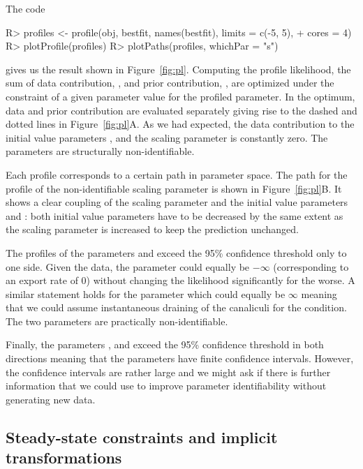 \documentclass[article]{jss}
\begin{document}
The code
\begin{CodeChunk}
\begin{CodeInput}
R> profiles <- profile(obj, bestfit, names(bestfit), limits = c(-5, 5),
+    cores = 4)
R> plotProfile(profiles)
R> plotPaths(profiles, whichPar = "s")
\end{CodeInput}
\end{CodeChunk}
%
gives us the result shown in Figure~\ref{fig:pl}.
Computing the profile likelihood, the sum of data contribution, , and prior contribution, , are optimized under the constraint of a given parameter value for the profiled parameter. In the optimum, data and prior contribution are evaluated separately giving rise to the dashed and dotted lines in Figure~\ref{fig:pl}A. As we had expected, the data contribution to the initial value parameters ,  and the scaling parameter  is constantly zero. The parameters are structurally non-identifiable.

Each profile corresponds to a certain path in parameter space. The path for the profile of the non-identifiable scaling parameter  is shown in Figure~\ref{fig:pl}B. It shows a clear coupling of the scaling parameter  and the initial value parameters  and : both initial value parameters have to be decreased by the same extent as the scaling parameter is increased to keep the prediction unchanged.

The profiles of the parameters  and  exceed the 95\% confidence threshold only to one side. Given the data, the  parameter could equally be $-\infty$ (corresponding to an export rate of 0) without changing the likelihood significantly for the worse. A similar statement holds for the  parameter which could equally be $\infty$ meaning that we could assume instantaneous draining of the canaliculi for the  condition. The two parameters are practically non-identifiable.

Finally, the parameters ,  and  exceed the 95\% confidence threshold in both directions meaning that the parameters have finite confidence intervals. However, the confidence intervals are rather large and we might ask if there is further information that we could use to improve parameter identifiability without generating new data.

\subsection{Steady-state constraints and implicit transformations}
\label{chap_steady_state}
\end{document}
